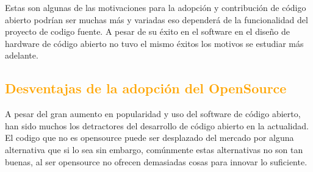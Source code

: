 \documentclass[a4paper,11pt]{article}
\begin{document}
 Estas son algunas de las motivaciones para la adopción y contribución de código abierto podrían ser muchas más y variadas eso dependerá de la funcionalidad del proyecto de codigo fuente. A pesar de su éxito en el software en el diseño de hardware de código abierto  no tuvo el mismo éxitos los motivos se estudiar más adelante.

		\subsection{\textcolor{orange}{Desventajas de la adopción del OpenSource}}

A pesar del gran aumento en popularidad y uso del software de código abierto, han sido muchos los detractores del desarrollo de código abierto en la actualidad. 
El codigo que no es opensource puede ser desplazado del mercado por alguna alternativa que si lo sea sin embargo, comúnmente estas alternativas no son tan buenas, al ser opensource no ofrecen demasiadas cosas para innovar lo suficiente.
\end{document}
